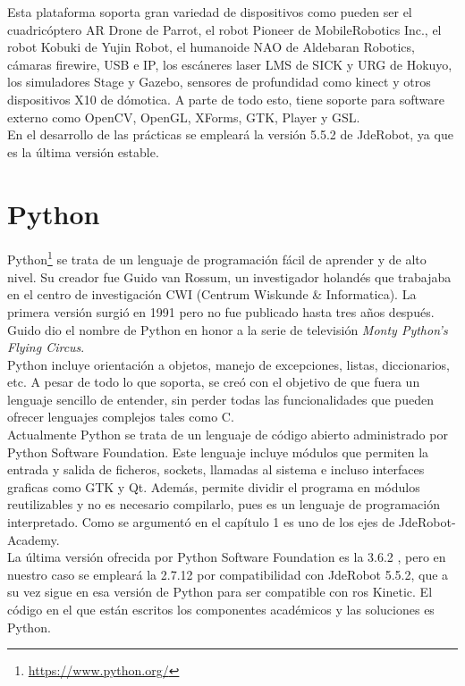 Esta plataforma soporta gran variedad de dispositivos como pueden ser el cuadricóptero AR Drone de Parrot, el robot Pioneer de MobileRobotics Inc., el robot Kobuki de Yujin Robot, el humanoide NAO de Aldebaran Robotics, cámaras firewire, USB e IP, los escáneres laser LMS de SICK y URG de Hokuyo, los simuladores Stage y Gazebo, sensores de profundidad como kinect y otros dispositivos X10 de dómotica. A parte de todo esto, tiene soporte para software externo como OpenCV, OpenGL, XForms, GTK, Player y GSL.   \\

En el desarrollo de las prácticas se empleará la versión 5.5.2 de JdeRobot, ya que es la última versión estable.


\section{Python}
Python\footnote{\url{https://www.python.org/}} se trata de un lenguaje de programación fácil de aprender y de alto nivel. Su creador fue Guido van Rossum, un investigador holandés que trabajaba en el centro de investigación CWI (Centrum Wiskunde \& Informatica). La primera versión surgió en 1991 pero no fue publicado hasta tres años después. Guido dio el nombre de Python en honor a la serie de televisión  \textit{Monty Python’s Flying Circus}.\\


Python incluye orientación a objetos, manejo de excepciones, listas, diccionarios, etc. A pesar de todo lo que soporta, se creó con el objetivo de que fuera un lenguaje sencillo de entender, sin perder todas las funcionalidades que pueden ofrecer lenguajes complejos tales como C.\\

Actualmente Python se trata de un lenguaje de código abierto administrado por Python Software Foundation. Este lenguaje incluye módulos que permiten la entrada y salida de ficheros, sockets, llamadas al sistema e incluso interfaces graficas como GTK y Qt. Además, permite dividir el programa en módulos reutilizables y no es necesario compilarlo, pues es un lenguaje de programación interpretado. Como se argumentó en el capítulo 1 es uno de los ejes de JdeRobot-Academy.\\

La última versión ofrecida por Python Software Foundation es la 3.6.2 , pero en nuestro caso se empleará la 2.7.12 por compatibilidad con JdeRobot 5.5.2, que a su vez sigue en esa versión de Python para ser compatible con \acrshort{ros} Kinetic. El código en el que están escritos los componentes académicos y las soluciones es Python.

